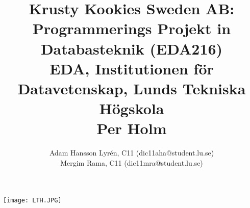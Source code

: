\documentclass[a4paper]{article}%
\title{
	Krusty Kookies Sweden AB: Programmerings Projekt in Databasteknik (EDA216)\\
	EDA, Institutionen för Datavetenskap, Lunds Tekniska Högskola\\
	Per Holm}
\author{
Adam Hansson Lyrén, C11 (dic11aha@student.lu.se)\\
Mergim Rama, C11 (dic11mra@student.lu.se)\\
}
\begin{document}

\maketitle
\centerline{\texttt{[image: LTH.JPG]}}
\thispagestyle{empty}
\newpage
\setcounter{page}{1}


\tableofcontents
\newpage










\end{document}

